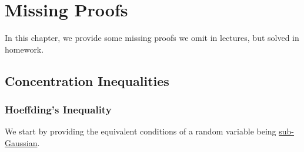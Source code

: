 \chapter{Missing Proofs}
In this chapter, we provide some missing proofs we omit in lectures, but solved in homework.

\section{Concentration Inequalities}
\subsection{Hoeffding's Inequality}
We start by providing the equivalent conditions of a random variable being \hyperref[def:sub-Gaussian]{sub-Gaussian}.

